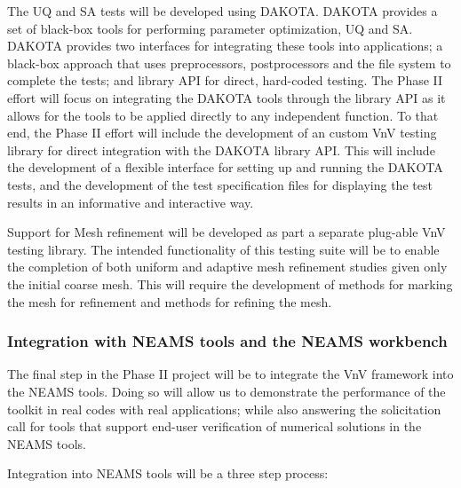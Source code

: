 The UQ and SA tests will be developed using DAKOTA. DAKOTA provides a set of black-box tools for performing parameter optimization, UQ 
and SA. DAKOTA provides two interfaces for integrating these tools into applications; a black-box approach that uses preprocessors, postprocessors
and the file system to complete the tests; and library API for direct, hard-coded testing. The Phase II effort will focus on integrating the 
DAKOTA tools through the library API as it allows for the tools to be applied directly to any independent function. To that end, the Phase II 
effort will include the development of an custom VnV testing library for direct integration with the DAKOTA library API. This will include the development
of a flexible interface for setting up and running the DAKOTA tests, and the development of the test specification files for displaying the test results 
in an informative and interactive way. 

Support for Mesh refinement will be developed as part a separate plug-able VnV testing library. The intended functionality of this testing 
suite will be to enable the completion of both uniform and adaptive mesh refinement studies given only the initial coarse mesh. This will require 
the development of methods for marking the mesh for refinement and methods for refining the mesh. 


\subsubsection{Integration with NEAMS tools and the NEAMS workbench} 

The final step in the Phase II project will be to integrate the VnV framework into the NEAMS 
tools. Doing so will allow us to demonstrate the performance of the toolkit in real codes with
real applications; while also answering the solicitation call for tools that support end-user 
verification of numerical solutions in the NEAMS tools. 

Integration into NEAMS tools will be a three step process:

